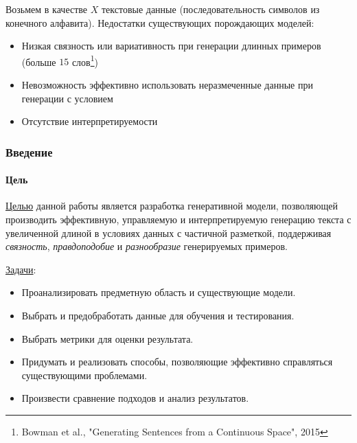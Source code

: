 \documentclass[10pt]{beamer}
\begin{document}
\begin{frame}
\vskip-1mm

Возьмем в качестве $X$ текстовые данные (последовательность символов из конечного алфавита). Недостатки существующих порождающих моделей:
\begin{itemize}
    \item Низкая связность или вариативность при генерации длинных примеров (больше $15$ слов\footnote{Bowman et al., "Generating Sentences from a Continuous Space", 2015})
    \item Невозможность эффективно использовать неразмеченные данные при генерации с условием
    \item Отсутствие интерпретируемости
\end{itemize}

\end{frame}
\begin{frame}
\frametitle{Введение}
\framesubtitle{Цель}


\underline{Целью} данной работы является разработка генеративной модели, позволяющей производить эффективную, управляемую и интерпретируемую генерацию текста с увеличенной длиной в условиях данных с частичной разметкой, поддерживая \textit{связность}, \textit{правдоподобие} и \textit{разнообразие} генерируемых примеров.

\vskip6mm

\underline{Задачи}:
\begin{itemize}
    \item Проанализировать предметную область и существующие модели.
    \item Выбрать и предобработать данные для обучения и тестирования.
    \item Выбрать метрики для оценки результата.
    \item Придумать и реализовать способы, позволяющие эффективно справляться существующими проблемами.
    \item Произвести сравнение подходов и анализ результатов.
\end{itemize}


\end{frame}
\end{document}
